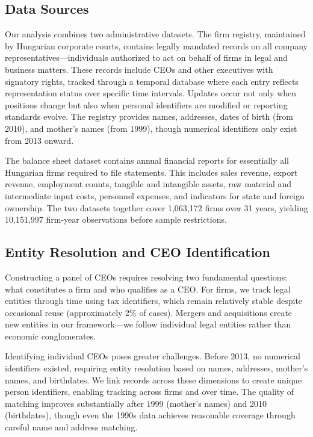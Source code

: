 \documentclass[11pt,a4paper]{article}
\begin{document}
\subsection{Data Sources}

Our analysis combines two administrative datasets. The firm registry, maintained by Hungarian corporate courts, contains legally mandated records on all company representatives—individuals authorized to act on behalf of firms in legal and business matters. These records include CEOs and other executives with signatory rights, tracked through a temporal database where each entry reflects representation status over specific time intervals. Updates occur not only when positions change but also when personal identifiers are modified or reporting standards evolve. The registry provides names, addresses, dates of birth (from 2010), and mother's names (from 1999), though numerical identifiers only exist from 2013 onward.

The balance sheet dataset contains annual financial reports for essentially all Hungarian firms required to file statements. This includes sales revenue, export revenue, employment counts, tangible and intangible assets, raw material and intermediate input costs, personnel expenses, and indicators for state and foreign ownership. The two datasets together cover 1,063,172 firms over 31 years, yielding 10,151,997 firm-year observations before sample restrictions.

\subsection{Entity Resolution and CEO Identification}

Constructing a panel of CEOs requires resolving two fundamental questions: what constitutes a firm and who qualifies as a CEO. For firms, we track legal entities through time using tax identifiers, which remain relatively stable despite occasional reuse (approximately 2\% of cases). Mergers and acquisitions create new entities in our framework—we follow individual legal entities rather than economic conglomerates.

Identifying individual CEOs poses greater challenges. Before 2013, no numerical identifiers existed, requiring entity resolution based on names, addresses, mother's names, and birthdates. We link records across these dimensions to create unique person identifiers, enabling tracking across firms and over time. The quality of matching improves substantially after 1999 (mother's names) and 2010 (birthdates), though even the 1990s data achieves reasonable coverage through careful name and address matching.
\end{document}
